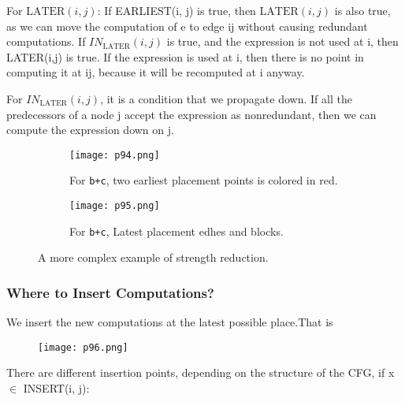
For \( \mathrm{LATER}(i,j) \): If	EARLIEST(i,	j)	is	true,	
then	\( \mathrm{LATER}(i,j) \)	is	also	true,	as	we	
can	move	the	computation	of	e	to	edge	ij	without	
causing	redundant	computations. 	If	\( IN_{\mathrm{LATER}}(i,j) \)	is	true,	
and	the	expression	is	not	used	at	i,	
then	LATER(i,j)	is	true.	If	the	expression	is	used	at	i,	then	there	is	no	point	in	
computing	it	at	ij,	because	it	will	be	recomputed	at	i
anyway.	


For \( IN_{\mathrm{LATER}}(i,j) \), it is	a	condition	that	
we	propagate	down.	If	all	the	predecessors	of	a	
node	j	accept	the	
expression	as	nonredundant,	then	we	can	
compute	the	expression	
down	on	j.	

\begin{figure}[H]
    \centering
    \begin{subfigure}{0.3\textwidth}
    \centering
        \texttt{[image: p94.png]}
        \caption{For \texttt{b+c}, 	two	
        earliest	placement	
        points is colored in red.}
        \label{fig:p94}
    \end{subfigure}
    \begin{subfigure}{0.4\textwidth}
    \centering
        \texttt{[image: p95.png]}
        \caption{For \texttt{b+c}, Latest placement edhes and blocks.}
        \label{fig:p95}
    \end{subfigure}
    
    \caption{A more complex example of strength reduction.}
       \label{fig:p74-76}
\end{figure}



\subsubsection{Where	to	Insert	Computations?}

We	insert	the	new	computations	at	the	latest	possible	
place.That is 

\begin{figure}[H]
    \centering
     \texttt{[image: p96.png]}
         
         \label{fig:p96}
\end{figure}


There	are	different	insertion	points,	depending	on	the	
structure	of	the	CFG,	if	x $\in$ INSERT(i,	j):	

